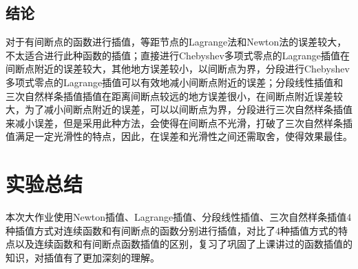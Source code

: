 \documentclass[a4paper]{article}
\begin{document}
\subsection{结论}
对于有间断点的函数进行插值，等距节点的Lagrange法和Newton法的误差较大，不太适合进行此种函数的插值；直接进行Chebyshev多项式零点的Lagrange插值在间断点附近的误差较大，其他地方误差较小，以间断点为界，分段进行Chebyshev多项式零点的Lagrange插值可以有效地减小间断点附近的误差；分段线性插值和三次自然样条插值插值在距离间断点较远的地方误差很小，在间断点附近误差较大，为了减小间断点附近的误差，可以以间断点为界，分段进行三次自然样条插值来减小误差，但是采用此种方法，会使得在间断点不光滑，打破了三次自然样条插值满足一定光滑性的特点，因此，在误差和光滑性之间还需取舍，使得效果最佳。

\section{实验总结}
本次大作业使用Newton插值、Lagrange插值、分段线性插值、三次自然样条插值4种插值方式对连续函数和有间断点的函数分别进行插值，对比了4种插值方式的特点以及连续函数和有间断点函数插值的区别，复习了巩固了上课讲过的函数插值的知识，对插值有了更加深刻的理解。
\end{document}
